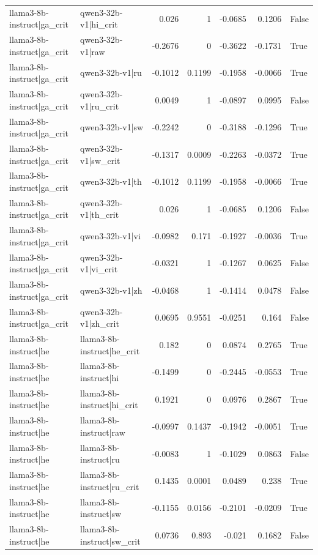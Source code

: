 \begin{table}
\begin{tabular}{l l r r r r l}
llama3-8b-instruct|ga_crit & qwen3-32b-v1|hi_crit & 0.026 & 1 & -0.0685 & 0.1206 & False \\
llama3-8b-instruct|ga_crit & qwen3-32b-v1|raw & -0.2676 & 0 & -0.3622 & -0.1731 & True \\
llama3-8b-instruct|ga_crit & qwen3-32b-v1|ru & -0.1012 & 0.1199 & -0.1958 & -0.0066 & True \\
llama3-8b-instruct|ga_crit & qwen3-32b-v1|ru_crit & 0.0049 & 1 & -0.0897 & 0.0995 & False \\
llama3-8b-instruct|ga_crit & qwen3-32b-v1|sw & -0.2242 & 0 & -0.3188 & -0.1296 & True \\
llama3-8b-instruct|ga_crit & qwen3-32b-v1|sw_crit & -0.1317 & 0.0009 & -0.2263 & -0.0372 & True \\
llama3-8b-instruct|ga_crit & qwen3-32b-v1|th & -0.1012 & 0.1199 & -0.1958 & -0.0066 & True \\
llama3-8b-instruct|ga_crit & qwen3-32b-v1|th_crit & 0.026 & 1 & -0.0685 & 0.1206 & False \\
llama3-8b-instruct|ga_crit & qwen3-32b-v1|vi & -0.0982 & 0.171 & -0.1927 & -0.0036 & True \\
llama3-8b-instruct|ga_crit & qwen3-32b-v1|vi_crit & -0.0321 & 1 & -0.1267 & 0.0625 & False \\
llama3-8b-instruct|ga_crit & qwen3-32b-v1|zh & -0.0468 & 1 & -0.1414 & 0.0478 & False \\
llama3-8b-instruct|ga_crit & qwen3-32b-v1|zh_crit & 0.0695 & 0.9551 & -0.0251 & 0.164 & False \\
llama3-8b-instruct|he & llama3-8b-instruct|he_crit & 0.182 & 0 & 0.0874 & 0.2765 & True \\
llama3-8b-instruct|he & llama3-8b-instruct|hi & -0.1499 & 0 & -0.2445 & -0.0553 & True \\
llama3-8b-instruct|he & llama3-8b-instruct|hi_crit & 0.1921 & 0 & 0.0976 & 0.2867 & True \\
llama3-8b-instruct|he & llama3-8b-instruct|raw & -0.0997 & 0.1437 & -0.1942 & -0.0051 & True \\
llama3-8b-instruct|he & llama3-8b-instruct|ru & -0.0083 & 1 & -0.1029 & 0.0863 & False \\
llama3-8b-instruct|he & llama3-8b-instruct|ru_crit & 0.1435 & 0.0001 & 0.0489 & 0.238 & True \\
llama3-8b-instruct|he & llama3-8b-instruct|sw & -0.1155 & 0.0156 & -0.2101 & -0.0209 & True \\
llama3-8b-instruct|he & llama3-8b-instruct|sw_crit & 0.0736 & 0.893 & -0.021 & 0.1682 & False \\

\end{tabular}
\end{table}
